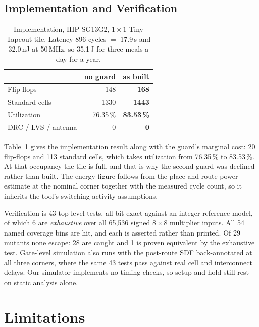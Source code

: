 \documentclass[conference]{IEEEtran}
\begin{document}
\subsection{Implementation and Verification}

\begin{table}[t]
\caption{Implementation, IHP SG13G2, $1\times1$ Tiny Tapeout tile.
Latency 896 cycles $=$ 17.9\,\textmu s and 32.0\,nJ at 50\,MHz, so
35.1\,\textmu J for three meals a day for a year.}
\label{tab:silicon}
\centering
\footnotesize
\begin{tabular}{lrr}
\toprule
 & no guard & \textbf{as built} \\
\midrule
Flip-flops                 & 148       & \textbf{168} \\
Standard cells             & 1330      & \textbf{1443} \\
Utilization                & 76.35\,\% & \textbf{83.53\,\%} \\
DRC / LVS / antenna        & 0         & \textbf{0} \\
\bottomrule
\end{tabular}
\end{table}

Table~\ref{tab:silicon} gives the implementation result along with the guard's
marginal cost: 20 flip-flops and 113 standard cells, which takes utilization
from 76.35\,\% to 83.53\,\%. At that occupancy the tile is full, and that is
why the second guard was declined rather than built. The energy figure follows
from the place-and-route power estimate at the nominal corner together with the
measured cycle count, so it inherits the tool's switching-activity assumptions.

Verification is 43 top-level tests, all bit-exact against an integer reference
model, of which 6 are \emph{exhaustive} over all 65{,}536 signed $8\times8$
multiplier inputs. All 54 named coverage bins are hit, and each is asserted
rather than printed. Of 29 mutants none escape: 28 are caught and 1 is proven
equivalent by the exhaustive test. Gate-level simulation also runs with the
post-route SDF back-annotated at all three corners, where the same 43 tests
pass against real cell and interconnect delays. Our simulator implements no
timing checks, so setup and hold still rest on static analysis alone.

\section{Limitations}
\end{document}
